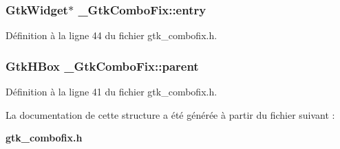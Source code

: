 \subsubsection[{entry}]{\setlength{\rightskip}{0pt plus 5cm}GtkWidget$\ast$ {\bf \_\-GtkComboFix::entry}}\label{struct__GtkComboFix_a72f2f64923323be1bfacebd41e485394}


Définition à la ligne 44 du fichier gtk\_\-combofix.h.

\subsubsection[{parent}]{\setlength{\rightskip}{0pt plus 5cm}GtkHBox {\bf \_\-GtkComboFix::parent}}\label{struct__GtkComboFix_a85179b950e21be9a25010494369992b4}


Définition à la ligne 41 du fichier gtk\_\-combofix.h.



La documentation de cette structure a été générée à partir du fichier suivant :\begin{DoxyCompactItemize}
\item 
{\bf gtk\_\-combofix.h}\end{DoxyCompactItemize}
